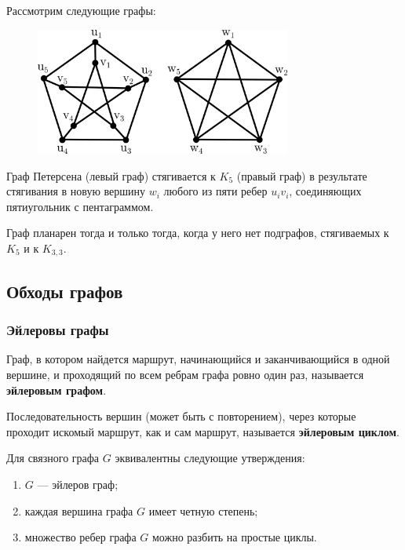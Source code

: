 \begin{example*}
    Рассмотрим следующие графы:
    \begin{figure}[H]
        \centering
        \includegraphics[width=0.75\textwidth]{images/graph-contraction-example.png}
    \end{figure}

    Граф Петерсена (левый граф) стягивается к \(K_5\) (правый граф) в результате стягивания в новую вершину \(w_i\) любого из пяти ребер \(u_i v_i\), соединяющих пятиугольник с пентаграммом.
\end{example*}

\begin{theorem*}
    Граф планарен тогда и только тогда, когда у него нет подграфов, стягиваемых к \(K_5\) и к \(K_{3, 3}\).
\end{theorem*}

\subsection{Обходы графов}

\subsubsection{Эйлеровы графы}

Граф, в котором найдется маршрут, начинающийся и заканчивающийся в одной вершине, и проходящий по всем ребрам графа ровно один раз, называется \textbf{эйлеровым графом}.

Последовательность вершин (может быть с повторением), через которые проходит искомый маршрут, как и сам маршрут, называется \textbf{эйлеровым циклом}.

\begin{theorem*}
    Для связного графа \(G\) эквивалентны следующие утверждения:
    \begin{enumerate}
        \item \(G\) --- эйлеров граф;
        \item каждая вершина графа \(G\) имеет четную степень;
        \item множество ребер графа \(G\) можно разбить на простые циклы.
    \end{enumerate}
\end{theorem*}

